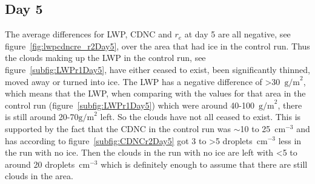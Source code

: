 \subsection{Day 5}
The average differences for LWP, CDNC and $r_e$ at day 5 are all negative, see figure~\ref{fig:lwpcdncre_r2Day5}, over the area that had ice in the control run. Thus the clouds making up the LWP in the control run, see figure~\ref{subfig:LWPr1Day5}, have either ceased to exist, been significantly thinned, moved away or turned into ice. The LWP has a negative difference of >30~$\text{g/m}^2$, which means that the LWP, when comparing with the values for that area in the control run (figure~\ref{subfig:LWPr1Day5}) which were around 40-100~$\text{g/m}^2$, there is still around 20-70$\text{g/m}^2$ left. So the clouds have not all ceased to exist. This is supported by the fact that the CDNC in the control run was $\sim$10 to 25~$\text{cm}^{-3}$ and has according to figure~\ref{subfig:CDNCr2Day5} got 3 to >5 droplets~$\text{cm}^{-3}$ less in the run with no ice. Then the clouds in the run with no ice are left with <5 to around 20 droplets~$\text{cm}^{-3}$ which is definitely enough to assume that there are still clouds in the area.

